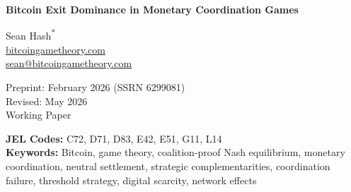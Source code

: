 \documentclass[12pt]{article}
\theoremstyle{definition}
\theoremstyle{remark}
\begin{document}
\thispagestyle{firstpage}


\begin{center}
{\LARGE\bfseries Bitcoin Exit Dominance in Monetary Coordination Games}

\bigskip

{\large Sean Hash\textsuperscript{*}}\\
\url{bitcoingametheory.com}\\
\href{mailto:sean@bitcoingametheory.com}{sean@bitcoingametheory.com}

\bigskip

Preprint: February 2026 (SSRN 6299081)\\
Revised: May 2026\\[4pt]
{\normalsize Working Paper}

\medskip

{\small
\textbf{JEL Codes:} C72, D71, D83, E42, E51, G11, L14\\[4pt]
\textbf{Keywords:} Bitcoin, game theory, coalition-proof Nash equilibrium, monetary coordination, neutral settlement, strategic complementarities, coordination failure, threshold strategy, digital scarcity, network effects
}
\end{center}

\bigskip


\begin{abstract}
\noindent
\textbf{Abstract.} In a multipolar world with no trusted monetary
coordinator, how do rational capital allocators preserve value when
sovereign settlement systems are subject to debasement and political
capture? The question is not hypothetical: the 2022 freezing of
Russian foreign-exchange reserves demonstrated that sovereign settlement
is capturable for any holder, central banks included. This paper models the choice as
the Exit Game, a non-cooperative game in which allocators choose
between capturable settlement systems, ``Stay'', and neutral settlement,
``Exit''. The model rests on four assumptions: persistent
multipolarity, rational self-interest, computational hardness, and the
persistence of network effects.
Three results follow. First, the payoff advantage of Exit over
Stay grows as adoption rises (Proposition~1). Second, no Stay
coalition is internally stable once any allocator's threshold is
reached (Proposition~2). Third, the high-Exit region above a critical
mass is coalition-proof against returning Stay coalitions, and persistent
debasement drives that critical mass monotonically downward over time (Theorem~1). Together these
establish Bitcoin as the primary candidate for neutral settlement
derived purely from ongoing incentives (Theorem~2). The formal Exit Game results show
viable neutral settlement creates a new form of competition for the
existing monetary order.
\end{abstract}
\end{document}
